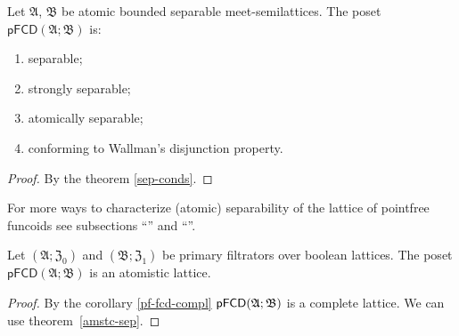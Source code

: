 \begin{cor}
\label{pf-fcd-is-sep}Let $\mathfrak{A}$, $\mathfrak{B}$ be atomic bounded separable meet-semilattices. The poset $\mathsf{pFCD}(\mathfrak{A};\mathfrak{B})$
is:
\begin{enumerate}
\item separable;
\item strongly separable;
\item atomically separable;
\item conforming to Wallman's disjunction property.
\end{enumerate}
\end{cor}
\begin{proof}
By the theorem \ref{sep-conds}.\end{proof}
\begin{rem}
For more ways to characterize (atomic) separability of the lattice
of pointfree funcoids see subsections ``''
and ``''.\end{rem}
\begin{cor}
\label{pf-atomistic}Let $(\mathfrak{A};\mathfrak{Z}_{0})$ and $(\mathfrak{B};\mathfrak{Z}_{1})$
be primary filtrators over boolean lattices. The poset $\mathsf{pFCD}(\mathfrak{A};\mathfrak{B})$
is an atomistic lattice.\end{cor}
\begin{proof}
By the corollary \ref{pf-fcd-compl} $\text{\ensuremath{\mathsf{pFCD}(\mathfrak{A};\mathfrak{B})}}$
is a complete lattice. We can use theorem~\ref{amstc-sep}.\end{proof}

